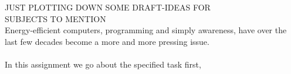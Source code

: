 JUST PLOTTING DOWN SOME DRAFT-IDEAS FOR \\SUBJECTS TO MENTION\\
Energy-efficient computers, programming and simply awareness, have over the last few decades become a more and more pressing issue. \\\\
In this assignment we go about the specified task first,

